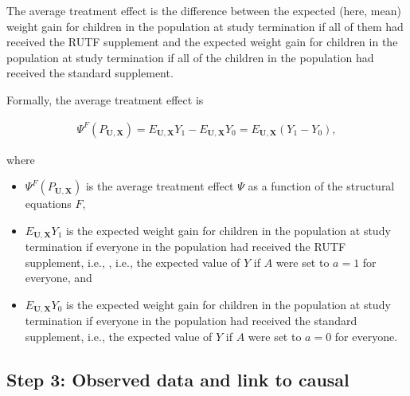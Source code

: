 \documentclass{article}\usepackage[]{graphicx}\usepackage[]{xcolor}
\begin{document}
\begin{enumerate}[label=\textbf{\alph*.}]
    The average treatment effect is the difference between the expected (here, mean) weight gain for children in the population at study termination if all of them had received the RUTF supplement and the expected weight gain for children in the population at study termination if all of the children in the population had received the standard supplement.
    
    Formally, the average treatment effect is

\begin{align*}    
\Psi^F(P_{\bm{U},\bm{X}}) = E_{\bm{U},\bm{X}}Y_1 - E_{\bm{U},\bm{X}}Y_0 = E_{\bm{U},\bm{X}}(Y_1 - Y_0),
\end{align*}
    
where

    \begin{itemize}

      \item $\Psi^F(P_{\bm{U},\bm{X}})$ is the average treatment effect $\Psi$ as a function of the structural equations $F$,
      \item $E_{\bm{U},\bm{X}}Y_1$ is the expected weight gain for children in the population at study termination if everyone in the population had received the RUTF supplement, i.e., , i.e., the expected value of $Y$ if $A$ were set to $a = 1$ for everyone, and
      \item $E_{\bm{U},\bm{X}}Y_0$ is the expected weight gain for children in the population at study termination if everyone in the population had received the standard supplement, i.e., the expected value of $Y$ if $A$ were set to $a = 0$ for everyone.

    \end{itemize}

  \end{enumerate}
  
  \subsection{Step 3: Observed data and link to causal}
  
\end{document}
